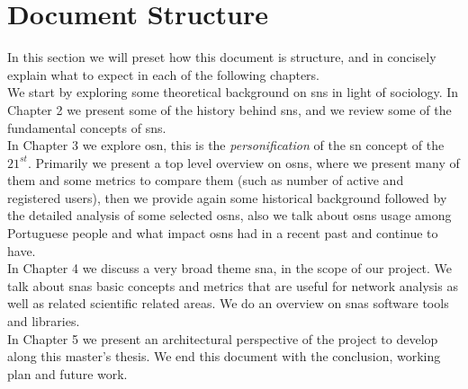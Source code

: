 \section{Document Structure}
In this section we will preset how this document is structure, and in concisely explain what to expect in each of the following chapters.\\
\indent We start by exploring some theoretical background on \glspl{sn} in light of sociology. In Chapter 2 we present some of the history behind \glspl{sn}, and we review some of the fundamental concepts of \glspl{sn}.\\
\indent In Chapter 3 we explore \acrfull{osn}, this is the \textit{personification} of the \gls{sn} concept of the $21^{st}$. Primarily we present a top level overview on \glspl{osn}, where we present many of them and some metrics to compare them (such as number of active and registered users), then we provide again some historical background followed by the detailed analysis of some selected \glspl{osn}, also we talk about \glspl{osn} usage among Portuguese people and what impact \glspl{osn} had in a recent past and continue to have.\\
\indent In Chapter 4 we discuss a very broad theme \acrfull{sna}, in the scope of our project. We talk about \glspl{sna} basic concepts and metrics that are useful for network analysis as well as related scientific related areas. We do an overview on \glspl{sna} software tools and libraries.\\
\indent In Chapter 5 we present an architectural perspective of the project to develop along this master's thesis. We end this document with the conclusion, working plan and future work.
